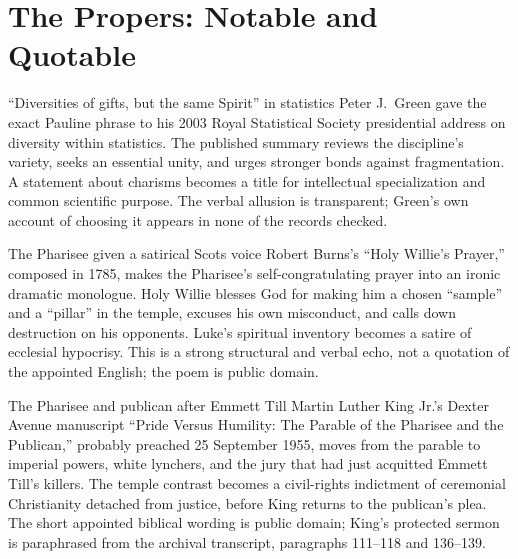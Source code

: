 \sectionguard
\section*{The Propers: Notable and Quotable}

\begin{studybox}{``Diversities of gifts, but the same Spirit'' in statistics}
Peter J.~Green gave the exact Pauline phrase to his 2003 Royal Statistical
Society presidential address on diversity within statistics. The published
summary reviews the discipline's variety, seeks an essential unity, and urges
stronger bonds against fragmentation. A statement about charisms becomes a
title for intellectual specialization and common scientific purpose. The
verbal allusion is transparent; Green's own account of choosing it appears in
none of the records checked.
\end{studybox}

\begin{studybox}{The Pharisee given a satirical Scots voice}
Robert Burns's ``Holy Willie's Prayer,'' composed in 1785, makes the
Pharisee's self-congratulating prayer into an ironic dramatic monologue. Holy
Willie blesses God for making him a chosen ``sample'' and a ``pillar'' in the
temple, excuses his own misconduct, and calls down destruction on his
opponents. Luke's spiritual inventory becomes a satire of ecclesial hypocrisy.
This is a strong structural and verbal echo, not a quotation of the appointed
English; the poem is public domain.
\end{studybox}

\begin{studybox}{The Pharisee and publican after Emmett Till}
Martin Luther King Jr.'s Dexter Avenue manuscript ``Pride Versus Humility: The
Parable of the Pharisee and the Publican,'' probably preached 25 September
1955, moves from the parable to imperial powers, white lynchers, and the jury
that had just acquitted Emmett Till's killers. The temple contrast becomes a
civil-rights indictment of ceremonial Christianity detached from justice,
before King returns to the publican's plea. The short appointed biblical
wording is public domain; King's protected sermon is paraphrased from the
archival transcript, paragraphs 111--118 and 136--139.
\end{studybox}
